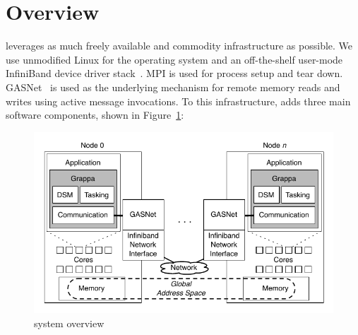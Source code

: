 \section{\Grappa Overview}

\Grappa leverages as much freely available and commodity infrastructure as
possible. We use unmodified Linux for the operating system and an
off-the-shelf user-mode InfiniBand device driver stack~\cite{OFED}. MPI is
used for process setup and tear down. GASNet~\cite{gasnet} is used as the
underlying mechanism for remote memory reads and writes using active message
invocations. To this infrastructure, \Grappa adds  three main software components, shown in Figure~\ref{fig:grappa}:

\begin{figure}[t]
\begin{center}
  \includegraphics[width=0.95\columnwidth]{figs/system-overview}
\begin{minipage}{0.95\columnwidth}
  \caption{\label{fig:grappa} \Grappa system overview}
\end{minipage}
\vspace{-3ex}
\end{center}
\end{figure}


